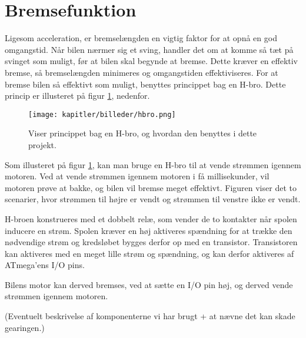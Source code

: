
\section{Bremsefunktion}

Ligesom acceleration, er bremselængden en vigtig faktor for at opnå en god omgangstid.
Når bilen nærmer sig et sving, handler det om at komme så tæt på svinget som muligt, før at bilen
skal begynde at bremse. Dette kræver en effektiv bremse, så bremselængden minimeres og omgangstiden effektiviseres.
For at bremse bilen så effektivt som muligt, benyttes princippet bag en H-bro. Dette princip er illusteret
på figur \ref{fig:hbro}, nedenfor.

\begin{figure}[ht]
    \centering
    \texttt{[image: kapitler/billeder/hbro.png]}
    \caption{Viser princippet bag en H-bro, og hvordan den benyttes i dette projekt.}
    \label{fig:hbro}
\end{figure}

Som illusteret på figur \ref{fig:hbro}, kan man bruge en H-bro til at vende strømmen igennem motoren.
Ved at vende strømmen igennem motoren i få millisekunder, vil motoren prøve at bakke,
og bilen vil bremse meget effektivt. Figuren viser det to scenarier, hvor strømmen til højre er vendt
og strømmen til venstre ikke er vendt.

H-broen konstrueres med et dobbelt relæ, som vender de to kontakter når spolen inducere en strøm.
Spolen kræver en høj aktiveres spændning for at trække den nødvendige strøm
og kredsløbet bygges derfor op med en transistor.
Transistoren kan aktiveres med en meget lille strøm og spændning, og kan derfor aktiveres
af ATmega'ens I/O pins.

Bilens motor kan derved bremses, ved at sætte en I/O pin høj, og derved vende strømmen igennem motoren.

(Eventuelt beskrivelse af komponenterne vi har brugt + at nævne det kan skade gearingen.)
